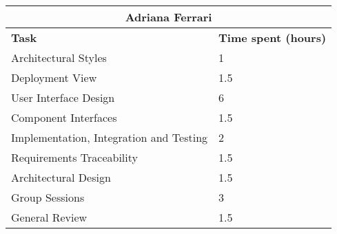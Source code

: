 \begin{table}[H]
  \center
  \begin{tabular}{l|l}
    \multicolumn{2}{c}{\textbf{Adriana Ferrari}} \\
    \hline
    \textbf{Task} & \textbf{Time spent (hours)}\\
    \hline
    Architectural Styles & 1 \\
    Deployment View & 1.5 \\
    User Interface Design & 6 \\
    Component Interfaces & 1.5 \\ 
    Implementation, Integration and Testing & 2 \\
    Requirements Traceability & 1.5 \\
    Architectural Design & 1.5 \\
    Group Sessions & 3 \\
    General Review & 1.5 \\
  \end{tabular}
\end{table}
